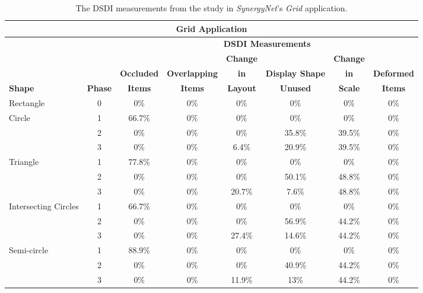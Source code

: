 \documentclass[twocolumn,compsoc]{cvm}
\newcommand{\smallline}{\arrayrulecolor{lightgray} \cline{2-8} \arrayrulecolor{black}}
\begin{document}
{\begin{table}
	\centering
	\begin{tabular}{ | l | c | c | c | c | c | c | c | }	
	\hline
	\multicolumn{8}{|c|}{\textbf{Grid Application}} \\
	\hline
	& & \multicolumn{6}{c|}{\textbf{\ac{DSDI} Measurements}} \\
	\cline{3-8}
		& & & & \textbf{Change} & & \textbf{Change} & \\
		& & \textbf{Occluded} & \textbf{Overlapping} & \textbf{in} & \textbf{Display Shape} & \textbf{in} & \textbf{Deformed} \\
		\textbf{Shape} & \textbf{Phase} & \textbf{Items} & \textbf{Items} & \textbf{Layout} & \textbf{Unused} & \textbf{Scale} & \textbf{Items} \\ 
	\hline
		Rectangle & 0 & 0\% & 0\% & 0\% & 0\% & 0\% & 0\% \\  
	\hline
		\multirow{3}{*}{Circle} & 1 & 66.7\% & 0\% & 0\% & 0\% & 0\% & 0\% \\ \smallline
		& 2 & 0\% & 0\% & 0\% & 35.8\% & 39.5\% & 0\% \\ \smallline
		& 3 & 0\% & 0\% & 6.4\% & 20.9\% & 39.5\% & 0\% \\
	\hline
		\multirow{3}{*}{Triangle} & 1 & 77.8\% & 0\% & 0\% & 0\% & 0\% & 0\% \\ \smallline
		& 2 & 0\% & 0\% & 0\% & 50.1\% & 48.8\% & 0\% \\ \smallline
		& 3 & 0\% & 0\% & 20.7\% & 7.6\% & 48.8\% & 0\% \\
	\hline
		\multirow{3}{*}{Intersecting Circles} & 1 & 66.7\% & 0\% & 0\% & 0\% & 0\% & 0\% \\ \smallline
		& 2 & 0\% & 0\% & 0\% & 56.9\% & 44.2\% & 0\% \\ \smallline
		& 3 & 0\% & 0\% & 27.4\% & 14.6\% & 44.2\% & 0\% \\
	\hline
		\multirow{3}{*}{Semi-circle} & 1 & 88.9\% & 0\% & 0\% & 0\% & 0\% & 0\% \\ \smallline
		& 2 & 0\% & 0\% & 0\% & 40.9\% & 44.2\% & 0\% \\ \smallline
		& 3 & 0\% & 0\% & 11.9\% & 13\% & 44.2\% & 0\% \\ 
	\hline
	\end{tabular}
	\caption{The \ac{DSDI} measurements from the study in {\emph{SynergyNet}}'s {\emph{Grid}} application.}
	\label{tab:gridApp}


\end{table}}
\end{document}
